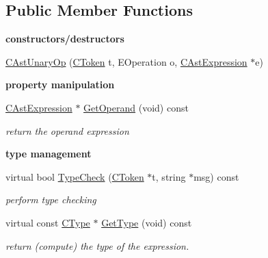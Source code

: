\subsection*{Public Member Functions}
\begin{Indent}{\bf constructors/destructors}\par
\begin{DoxyCompactItemize}
\item 
\hyperlink{classCAstUnaryOp_a88f0ad991c655e7e24b55e47d9238d00}{C\-Ast\-Unary\-Op} (\hyperlink{classCToken}{C\-Token} t, E\-Operation o, \hyperlink{classCAstExpression}{C\-Ast\-Expression} $\ast$e)
\end{DoxyCompactItemize}
\end{Indent}
\begin{Indent}{\bf property manipulation}\par
\begin{DoxyCompactItemize}
\item 
\hyperlink{classCAstExpression}{C\-Ast\-Expression} $\ast$ \hyperlink{classCAstUnaryOp_ad335859d62a6b1c8dfceea60b972b2db}{Get\-Operand} (void) const 
\begin{DoxyCompactList}\small\item\em return the operand expression \end{DoxyCompactList}\end{DoxyCompactItemize}
\end{Indent}
\begin{Indent}{\bf type management}\par
\begin{DoxyCompactItemize}
\item 
virtual bool \hyperlink{classCAstUnaryOp_a46f64517d4c5c17c205bfd9e7a81779c}{Type\-Check} (\hyperlink{classCToken}{C\-Token} $\ast$t, string $\ast$msg) const 
\begin{DoxyCompactList}\small\item\em perform type checking \end{DoxyCompactList}\item 
\hypertarget{classCAstUnaryOp_ab4546d343d046aafd4f092abf7b52ecc}{virtual const \hyperlink{classCType}{C\-Type} $\ast$ \hyperlink{classCAstUnaryOp_ab4546d343d046aafd4f092abf7b52ecc}{Get\-Type} (void) const }\label{classCAstUnaryOp_ab4546d343d046aafd4f092abf7b52ecc}

\begin{DoxyCompactList}\small\item\em return (compute) the type of the expression. \end{DoxyCompactList}\end{DoxyCompactItemize}
\end{Indent}
